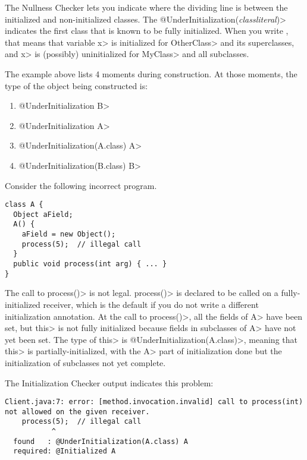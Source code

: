 The Nullness Checker lets you indicate where the dividing line is between
the initialized and non-initialized classes.
The \<@UnderInitialization(\emph{classliteral})>
indicates the first class that is known to be fully initialized.
When you write , that
means that variable \<x> is initialized for \<OtherClass> and its
superclasses, and \<x> is (possibly) uninitialized for \<MyClass> and all subclasses.

The example above lists 4 moments during construction.  At those moments,
the type of the object being constructed is:

\begin{enumerate}
\item
  \<@UnderInitialization B>
\item
  \<@UnderInitialization A>
\item
  \<@UnderInitialization(A.class) A>
\item
  \<@UnderInitialization(B.class) B>
\end{enumerate}



Consider the following incorrect program.

\begin{Verbatim}
class A {
  Object aField;
  A() {
    aField = new Object();
    process(5);  // illegal call
  }
  public void process(int arg) { ... }
}
\end{Verbatim}

The call to \<process()> is not legal.
\<process()> is declared to be called on a fully-initialized receiver, which is
the default if you do not write a different initialization annotation.
At the call to \<process()>, all the fields of \<A> have been set,
but \<this> is not fully initialized because fields in subclasses of \<A> have
not yet been set.  The type of \<this> is \<@UnderInitialization(A.class)>,
meaning that \<this> is partially-initialized, with the \<A> part of
initialization done but the initialization of subclasses not yet complete.

The Initialization Checker output indicates this problem:

\begin{Verbatim}
Client.java:7: error: [method.invocation.invalid] call to process(int) not allowed on the given receiver.
    process(5);  // illegal call
           ^
  found   : @UnderInitialization(A.class) A
  required: @Initialized A
\end{Verbatim}

